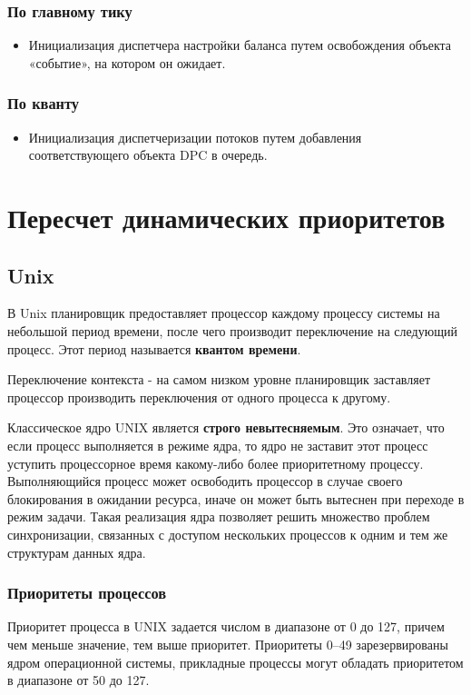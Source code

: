 \documentclass[12pt]{report}
\begin{document}
\subsection{По главному тику}
\begin{itemize}
	\item Инициализация диспетчера настройки баланса путем освобождения объекта «событие», на котором он ожидает.

\end{itemize}
\subsection{По кванту}
\begin{itemize}
	\item Инициализация диспетчеризации потоков путем добавления соответствующего объекта DPC в очередь.
\end{itemize}

\chapter{Пересчет динамических приоритетов}
\section{Unix}
В Unix планировщик предоставляет процессор каждому процессу системы на небольшой период времени, после чего производит переключение на следующий процесс. Этот период называется \textbf{квантом времени}.

Переключение контекста - на самом низком уровне планировщик заставляет процессор производить переключения от одного процесса к другому.

Классическое ядро UNIX является \textbf{строго невытесняемым}. Это означает, что если процесс выполняется в режиме ядра, то ядро не заставит этот процесс уступить процессорное время какому-либо более приоритетному процессу. Выполняющийся процесс может освободить процессор в случае своего блокирования в ожидании ресурса, иначе он может быть вытеснен при переходе в режим задачи. Такая реализация ядра позволяет решить множество проблем синхронизации, связанных с доступом нескольких процессов к одним и тем же структурам данных ядра.

\subsection{Приоритеты процессов}
Приоритет процесса в UNIX задается числом в диапазоне от 0 до 127, причем чем меньше значение, тем выше приоритет. Приоритеты 0–49 зарезервированы ядром операционной системы, прикладные процессы могут обладать приоритетом в диапазоне от 50 до 127.
\end{document}
